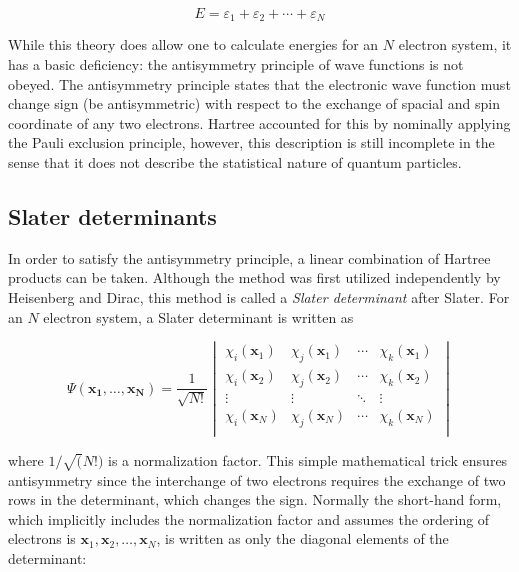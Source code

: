 \begin{equation}
E = \varepsilon_1 + \varepsilon_2 + \cdots + \varepsilon_N
\end{equation}

While this theory does allow one to calculate energies for an $N$ electron
system, it has a basic deficiency: the antisymmetry principle of wave functions
is not obeyed. The antisymmetry principle states that the electronic wave
function must change sign (be antisymmetric) with respect to the exchange of
spacial and spin coordinate of any two electrons. Hartree accounted for this by
nominally applying the Pauli exclusion principle, however, this description is
still incomplete in the sense that it does not describe the statistical nature
of quantum particles.

\subsection{Slater determinants}

In order to satisfy the antisymmetry principle, a linear combination of Hartree
products can be taken. Although the method was first utilized independently by
Heisenberg\cite{Heisenberg1926} and Dirac,\cite{Dirac1926} this method is
called a \emph{Slater determinant} after Slater.\cite{Slater1929} For an $N$
electron system, a Slater determinant is written as

\begin{equation}
\Psi(\mathbf{x_1},\ldots,\mathbf{x_N}) = \frac{1}{\sqrt{N!}}
\begin{vmatrix}
\chi_i(\mathbf{x}_1) & \chi_j(\mathbf{x}_1) & \cdots & \chi_k(\mathbf{x}_1) \\
\chi_i(\mathbf{x}_2) & \chi_j(\mathbf{x}_2) & \cdots & \chi_k(\mathbf{x}_2) \\
\vdots & \vdots & \ddots & \vdots \\
\chi_i(\mathbf{x}_N) & \chi_j(\mathbf{x}_N) & \cdots & \chi_k(\mathbf{x}_N) \\
\end{vmatrix}
\end{equation}

\noindent where $1/\sqrt(N!)$ is a normalization factor. This simple
mathematical trick ensures antisymmetry since the interchange of two electrons
requires the exchange of two rows in the determinant, which changes the sign.
Normally the short-hand form, which implicitly includes the normalization
factor and assumes the ordering of electrons is
$\mathbf{x}_1,\mathbf{x}_2,\dots,\mathbf{x}_N$, is written as only the diagonal
elements of the determinant:

